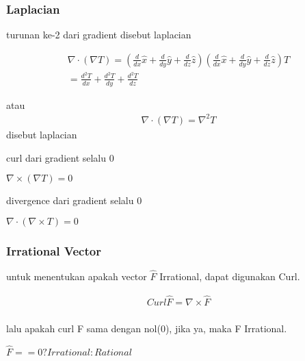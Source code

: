 \subsubsection{Laplacian}
turunan ke-2 dari gradient disebut laplacian 

\begin{gather}
\displaystyle  \nabla \cdot (\nabla T) = (\frac{d}{dx} \hat{x} + \frac{d}{dy} \hat{y} + \frac{d}{dz} \hat{z}) (\frac{d}{dx} \hat{x} + \frac{d}{dy} \hat{y} + \frac{d}{dz} \hat{z}) T \\ 
= \displaystyle \frac{d^2T}{dx} + \frac{d^2T}{dy} + \frac{d^2T}{dz}
\end{gather}

atau 
\begin{gather}
  \nabla \cdot (\nabla T) = \nabla^2 T
\end{gather}
disebut laplacian

curl dari gradient selalu 0 

$\nabla \times (\nabla T)=0$

divergence dari gradient selalu 0 

$\nabla \cdot  (\nabla \times T)=0$


\subsubsection{Irrational Vector}
untuk menentukan apakah vector $\hat{F}$ Irrational, dapat digunakan Curl.

\begin{gather}
  Curl \hat{F} = \nabla \times \hat{F}\\
\end{gather}

lalu apakah curl F sama dengan nol(0), jika ya, maka F Irrational. 

$\displaystyle\hat{F} == 0 ? Irrational : Rational$ 


















